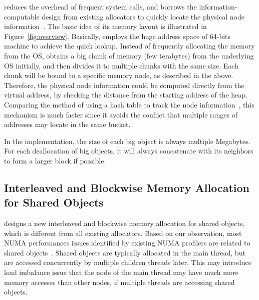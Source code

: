  

\NA{} reduces the overhead of frequent system calls, and borrows the information-computable design from existing allocators to quickly locate the physical node information~\cite{FreeGuard, Guarder}. The basic idea of its memory layout is illustrated in Figure~\ref{fig:overview}. Basically, \NA{} employs the huge address space of 64-bits machine to achieve the quick lookup. Instead of frequently allocating the memory from the OS, \NA{} obtains a big chunk of memory (few terabytes) from the underlying OS initially, and then divides it to multiple chunks with the same size. Each chunk will be bound to a specific memory node, as described in the above. Therefore, the physical node information could be computed  directly from the virtual address, by checking the distance from the starting address of the heap. Comparing the method of using a hash table to track the node information~\cite{tcmallocnew}, this mechanism is much faster since it avoids the  conflict that multiple ranges of addresses may locate in the same bucket. 

In the implementation, 
the size of each big object is always multiple Megabytes. For each deallocation of big objects, it will always concatenate with its neighbors to form a larger block if possible.       

\subsection{Interleaved and Blockwise Memory Allocation for Shared Objects} 
\label{sec:mainthread}

\NA{} designs a new interleaved and blockwise memory allocation for shared objects, which is different from all existing allocators. Based on our observation, most NUMA performances issues identified by existing NUMA profilers are related to shared objects~\cite{XULIU, MemProf}. Shared objects are typically allocated in the main thread, but are accessed concurrently by multiple children threads later. This may introduce load imbalance issue that the node  of the main thread may have much more memory accesses than other nodes, if multiple threads are accessing shared objects.   

